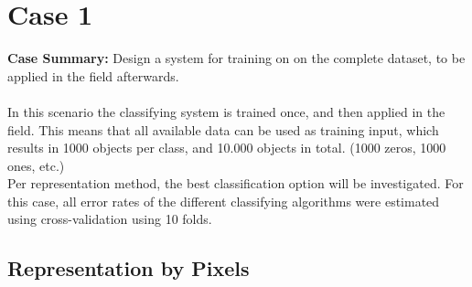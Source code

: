 \newpage
\section{Case 1}
\label{sec:Case1}
\textbf{Case Summary:} Design a system for training on on the complete dataset, to be applied in the field afterwards.\\
\\
In this scenario the classifying system is trained once, and then applied in the field. This means that all available data can be used as training input, which results in 1000 objects per class, and 10.000 objects in total. (1000 zeros, 1000 ones, etc.) \\
Per representation method, the best classification option will be investigated. For this case, all error rates of the different classifying algorithms were estimated using cross-validation using 10 folds.\\

\subsection{Representation by Pixels}
